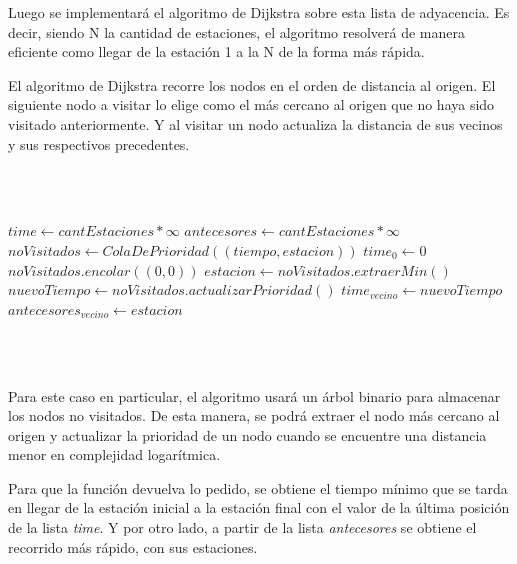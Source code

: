     \par Luego se implementará el algoritmo de Dijkstra sobre esta lista de adyacencia. Es decir, siendo N la cantidad de estaciones, el algoritmo resolverá de manera eficiente como llegar de la estación 1 a la N de la forma más rápida.
    \par El algoritmo de Dijkstra recorre los nodos en el orden de distancia al origen. El siguiente nodo a visitar lo elige como el más cercano al origen que no haya sido visitado anteriormente. Y al visitar un nodo actualiza la distancia de sus vecinos y sus respectivos precedentes.
    
     \\~\\
    
    \begin{algorithmic}
    \State {}
        \State $time\gets cantEstaciones * \infty$ 
        \State $antecesores\gets cantEstaciones * \infty$ 
        \State $noVisitados\gets ColaDePrioridad((tiempo, estacion))$ 
        \State $time_{0}\gets 0$ 
        \State $noVisitados.encolar((0,0))$ 
         
            \State $estacion\gets noVisitados.extraerMin()$ 
             
                 
                    \State $nuevoTiempo\gets noVisitados.actualizarPrioridad()$ 
                    \State $time_{vecino}\gets nuevoTiempo$ 
                    \State $antecesores_{vecino}\gets estacion$ 
                \EndIf
            \EndFor
        \EndWhile
        \State {} 
    \EndFunction
    \end{algorithmic}
    
     \\~\\
    
    \par  Para este caso en particular, el algoritmo usará un árbol binario para almacenar los nodos no visitados. De esta manera, se podrá extraer el nodo más cercano al origen y actualizar la prioridad de un nodo cuando se encuentre una distancia menor en complejidad logarítmica.
    \par Para que la función devuelva lo pedido, se obtiene el tiempo mínimo que se tarda en llegar de la estación inicial a la estación final con el valor de la última posición de la lista \emph{time}. Y por otro lado, a partir de la lista \emph{antecesores} se obtiene el recorrido más rápido, con sus estaciones.

